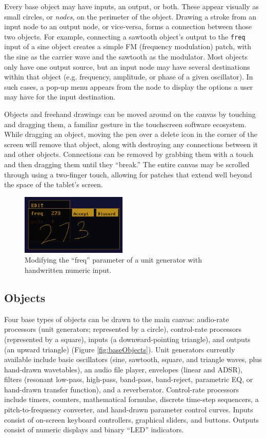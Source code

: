 \documentclass{nime-alternate}
\begin{document}
Every base object may have inputs, an output, or both. These appear visually as small circles, or \emph{nodes}, on the perimeter of the object. 
Drawing a stroke from an input node to an output node, or vice-versa, forms a connection between those two objects. 
For example, connecting a sawtooth object's output to the \texttt{freq} input of a sine object creates a simple FM (frequency modulation) patch, with the sine as the carrier wave and the sawtooth as the modulator. 
Most objects only have one output source, but an input node may have several destinations within that object (e.g. frequency, amplitude, or phase of a given oscillator). 
In such cases, a pop-up menu appears from the node to display the options a user may have for the input destination. 

Objects and freehand drawings can be moved around on the canvas by touching and dragging them, a familiar gesture in the touchscreen software ecosystem. 
While dragging an object, moving the pen over a delete icon in the corner of the screen will remove that object, along with destroying any connections between it and other objects. 
Connections can be removed by grabbing them with a touch and then dragging them until they ``break.''
The entire canvas may be scrolled through using a two-finger touch, allowing for patches that extend well beyond the space of the tablet's screen. 

\begin{figure}[h]
	\centering
		\includegraphics[width=0.45\textwidth]{figures/editor.png}
	\caption{Modifying the ``freq'' parameter of a unit generator with handwritten numeric input.}
	\label{fig:editor}
\end{figure}

\subsection{Objects}
\label{sec:BaseGlyphs}

Four base types of objects can be drawn to the main canvas: audio-rate processors (unit generators; represented by a circle), control-rate processors (represented by a square), inputs (a downward-pointing triangle), and outputs (an upward triangle) (Figure \ref{fig:baseObjects}). 
Unit generators currently available include basic oscillators (sine, sawtooth, square, and triangle waves, plus hand-drawn wavetables), an audio file player, envelopes (linear and ADSR), filters (resonant low-pass, high-pass, band-pass, band-reject, parametric EQ, or hand-drawn transfer function), and a reverberator. 
Control-rate processors include timers, counters, mathematical formulae, discrete time-step sequencers, a pitch-to-frequency converter, and hand-drawn parameter control curves. 
Inputs consist of on-screen keyboard controllers, graphical sliders, and buttons. 
Outputs consist of numeric displays and binary ``LED'' indicators. 
\end{document}
